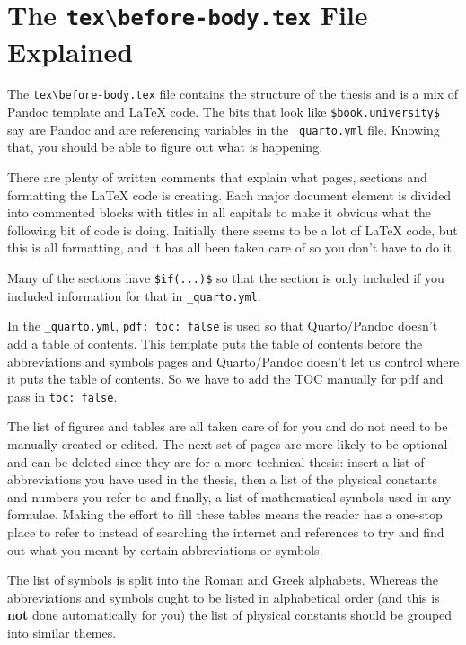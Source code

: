 \documentclass[
  letterpaper,
  11pt,
  english,
  singlespacing,
  headsepline]{MastersDoctoralThesis}
\begin{document}
\section{\texorpdfstring{The \texttt{tex\textbackslash{}before-body.tex}
File
Explained}{The tex\textbackslash before-body.tex File Explained}}\label{the-texbefore-body.tex-file-explained}

The \texttt{tex\textbackslash{}before-body.tex} file contains the
structure of the thesis and is a mix of Pandoc template and \LaTeX{}
code. The bits that look like \texttt{\$book.university\$} say are
Pandoc and are referencing variables in the \texttt{\_quarto.yml} file.
Knowing that, you should be able to figure out what is happening.

There are plenty of written comments that explain what pages, sections
and formatting the \LaTeX{} code is creating. Each major document
element is divided into commented blocks with titles in all capitals to
make it obvious what the following bit of code is doing. Initially there
seems to be a lot of \LaTeX{} code, but this is all formatting, and it
has all been taken care of so you don't have to do it.

Many of the sections have \texttt{\$if(...)\$} so that the section is
only included if you included information for that in
\texttt{\_quarto.yml}.

In the \texttt{\_quarto.yml}, \texttt{pdf:\ toc:\ false} is used so that
Quarto/Pandoc doesn't add a table of contents. This template puts the
table of contents before the abbreviations and symbols pages and
Quarto/Pandoc doesn't let us control where it puts the table of
contents. So we have to add the TOC manually for pdf and pass in
\texttt{toc:\ false}.

The list of figures and tables are all taken care of for you and do not
need to be manually created or edited. The next set of pages are more
likely to be optional and can be deleted since they are for a more
technical thesis: insert a list of abbreviations you have used in the
thesis, then a list of the physical constants and numbers you refer to
and finally, a list of mathematical symbols used in any formulae. Making
the effort to fill these tables means the reader has a one-stop place to
refer to instead of searching the internet and references to try and
find out what you meant by certain abbreviations or symbols.

The list of symbols is split into the Roman and Greek alphabets. Whereas
the abbreviations and symbols ought to be listed in alphabetical order
(and this is \textbf{not} done automatically for you) the list of
physical constants should be grouped into similar themes.
\end{document}
